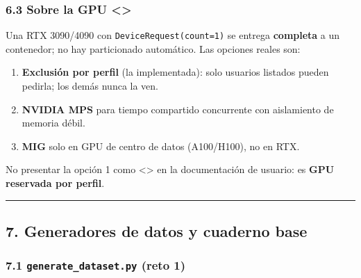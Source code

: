 \documentclass[11pt,a4paper]{article}
\providecommand{\tightlist}{%
  \setlength{\itemsep}{0pt}\setlength{\parskip}{0pt}}
\begin{document}
\hypertarget{63-sobre-la-gpu-}{%
\subsubsection{\texorpdfstring{6.3 Sobre la GPU \textless{}\textgreater{}}{6.3 Sobre la GPU \textless\textgreater{}}}\label{63-sobre-la-gpu-}}

Una RTX 3090/4090 con \texttt{DeviceRequest(count=1)} se entrega \textbf{completa} a un contenedor; no hay particionado automático. Las opciones reales son:

\begin{enumerate}
\def\labelenumi{\arabic{enumi}.}
\tightlist
\item
  \textbf{Exclusión por perfil} (la implementada): solo usuarios listados pueden pedirla; los demás nunca la ven.
\item
  \textbf{NVIDIA MPS} para tiempo compartido concurrente con aislamiento de memoria débil.
\item
  \textbf{MIG} solo en GPU de centro de datos (A100/H100), no en RTX.
\end{enumerate}

No presentar la opción 1 como \textless{}\textgreater{} en la documentación de usuario: es \textbf{GPU reservada por perfil}.

\begin{center}\rule{0.5\linewidth}{0.5pt}\end{center}

\hypertarget{7-generadores-de-datos-y-cuaderno-base}{%
\subsection{7. Generadores de datos y cuaderno base}\label{7-generadores-de-datos-y-cuaderno-base}}

\hypertarget{71-generate_datasetpy-reto-1}{%
\subsubsection{\texorpdfstring{7.1 \texttt{generate\_\allowbreak{}dataset.\allowbreak{}py} (reto 1)}{7.1 generate\_dataset.py (reto 1)}}\label{71-generate_datasetpy-reto-1}}
\end{document}
